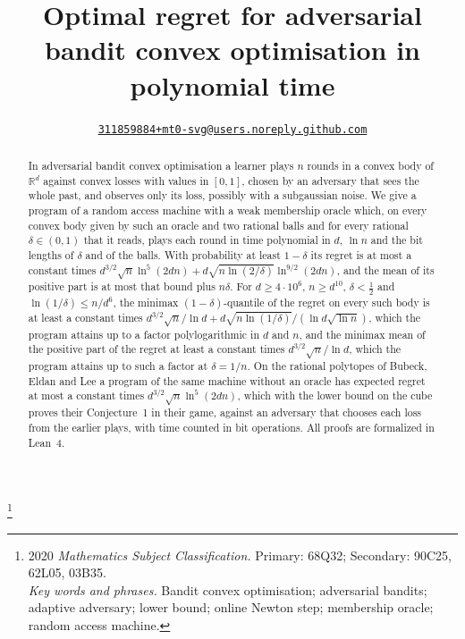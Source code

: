 \documentclass[11pt]{amsart}
\makeatletter
\theoremstyle{definition}
\numberwithin{equation}{section}
\newcommand{\repo}{https://github.com/mt0-svg/adversarial-bco}
\DeclareRobustCommand{\authorlink}{\href{\repo/issues/new/choose}{\nolinkurl{311859884+mt0-svg@users.noreply.github.com}}}
\makeatother
\begin{document}
\title[Adversarial bandit convex optimisation]{Optimal regret for adversarial bandit convex optimisation in polynomial time}
\author{\authorlink}
\thanks{2020 {\em Mathematics Subject Classification.} Primary: 68Q32; Secondary: 90C25, 62L05, 03B35.\\\indent
{\em Key words and phrases.} Bandit convex optimisation; adversarial bandits; adaptive adversary; lower bound; online Newton step; membership oracle; random access machine.}

\begin{abstract}
In adversarial bandit convex optimisation a learner plays $n$ rounds in a convex body of $\mathbb R^d$ against convex losses with values in $[0,1]$, chosen by an adversary that sees the whole past, and observes only its loss, possibly with a subgaussian noise. We give a program of a random access machine with a weak membership oracle which, on every convex body given by such an oracle and two rational balls and for every rational $\delta\in(0,1)$ that it reads, plays each round in time polynomial in $d$, $\ln n$ and the bit lengths of $\delta$ and of the balls. With probability at least $1-\delta$ its regret is at most a constant times $d^{3/2}\sqrt n\ln^5(2dn)+d\sqrt{n\ln(2/\delta)}\ln^{9/2}(2dn)$, and the mean of its positive part is at most that bound plus $n\delta$. For $d\ge4\cdot10^6$, $n\ge d^{10}$, $\delta<\frac12$ and $\ln(1/\delta)\le n/d^6$, the minimax $(1-\delta)$-quantile of the regret on every such body is at least a constant times $d^{3/2}\sqrt n/\ln d+d\sqrt{n\ln(1/\delta)}/(\ln d\sqrt{\ln n})$, which the program attains up to a factor polylogarithmic in $d$ and $n$, and the minimax mean of the positive part of the regret at least a constant times $d^{3/2}\sqrt n/\ln d$, which the program attains up to such a factor at $\delta=1/n$. On the rational polytopes of Bubeck, Eldan and Lee a program of the same machine without an oracle has expected regret at most a constant times $d^{3/2}\sqrt n\ln^5(2dn)$, which with the lower bound on the cube proves their Conjecture~1 in their game, against an adversary that chooses each loss from the earlier plays, with time counted in bit operations. All proofs are formalized in Lean~4.
\end{abstract}

\maketitle
\end{document}
